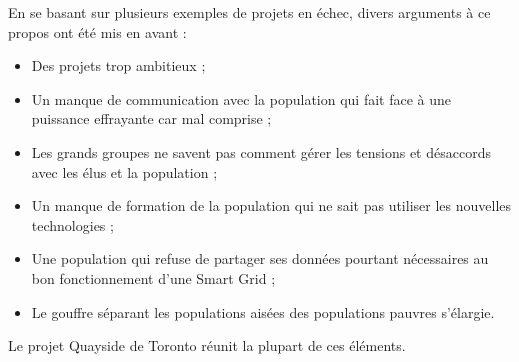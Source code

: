 En se basant sur plusieurs exemples de projets en échec, divers arguments à ce propos ont été mis en 
avant : 
\begin{itemize}
    \item Des projets trop ambitieux ;
    \item Un manque de communication avec la population qui fait face à une puissance effrayante car mal comprise ;
    \item Les grands groupes ne savent pas comment gérer les tensions et désaccords avec les élus et la population ; 
    \item Un manque de formation de la population qui ne sait pas utiliser les nouvelles technologies ;
    \item Une population qui refuse de partager ses données pourtant nécessaires au bon fonctionnement d’une Smart Grid ;
    \item Le gouffre séparant les populations aisées des populations pauvres s'élargie.
\end{itemize}

Le projet Quayside de Toronto réunit la plupart de ces éléments. 
